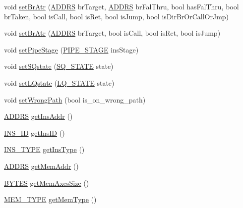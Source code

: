 \begin{DoxyCompactItemize}
\item 
void \hyperlink{classdynInstruction_ac71f51f5c4f207d4993acdfc0a2abbc1}{setBrAtr} (\hyperlink{global_2global_8h_a7ea74bb9ffd2e4d41550ae2383dd25bc}{ADDRS} brTarget, \hyperlink{global_2global_8h_a7ea74bb9ffd2e4d41550ae2383dd25bc}{ADDRS} brFalThru, bool hasFalThru, bool brTaken, bool isCall, bool isRet, bool isJump, bool isDirBrOrCallOrJmp)
\item 
void \hyperlink{classdynInstruction_a4d1879c3a2a4170fb103932044dc863f}{setBrAtr} (\hyperlink{global_2global_8h_a7ea74bb9ffd2e4d41550ae2383dd25bc}{ADDRS} brTarget, bool isCall, bool isRet, bool isJump)
\item 
void \hyperlink{classdynInstruction_a0cb15d906e84b2efc8986b74edaf5adf}{setPipeStage} (\hyperlink{global_2global_8h_a015eb90e0de9f16e87bd149d4b9ce959}{PIPE\_\-STAGE} insStage)
\item 
void \hyperlink{classdynInstruction_a7fc66de5e3f826f515e41029619e2088}{setSQstate} (\hyperlink{global_2global_8h_af9e953470c71a91625fe1fc66f2dc49b}{SQ\_\-STATE} state)
\item 
void \hyperlink{classdynInstruction_a83a5077984f29a340de7bebc7e0b679c}{setLQstate} (\hyperlink{global_2global_8h_a49734aedeaf1d3f1c93c4778b3b62205}{LQ\_\-STATE} state)
\item 
void \hyperlink{classdynInstruction_a794898f3f2f9a99de5f8ca4b8f8999c4}{setWrongPath} (bool is\_\-on\_\-wrong\_\-path)
\item 
\hyperlink{global_2global_8h_a7ea74bb9ffd2e4d41550ae2383dd25bc}{ADDRS} \hyperlink{classdynInstruction_a464da2601438384a3c00e85a814c3964}{getInsAddr} ()
\item 
\hyperlink{global_2global_8h_a1883c47d0023d0f200e1d86eced6a070}{INS\_\-ID} \hyperlink{classdynInstruction_ab38b8181f522daae77cb46d701fb5302}{getInsID} ()
\item 
\hyperlink{binaryTranslator_2global_8h_a7aead736a07eaf25623ad7bfa1f0ee2d}{INS\_\-TYPE} \hyperlink{classdynInstruction_a3a7025de98c539d8eaa06b40ac2e8cc8}{getInsType} ()
\item 
\hyperlink{global_2global_8h_a7ea74bb9ffd2e4d41550ae2383dd25bc}{ADDRS} \hyperlink{classdynInstruction_a611e3f3619160361cf317e05d2034288}{getMemAddr} ()
\item 
\hyperlink{global_2global_8h_a430d9e51ff815ddfce06905ae7392e83}{BYTES} \hyperlink{classdynInstruction_aee508d76a2e13461fce2299234894688}{getMemAxesSize} ()
\item 
\hyperlink{global_2global_8h_a40bc49627faaf5adeed28388c6ffae9c}{MEM\_\-TYPE} \hyperlink{classdynInstruction_a9f8a63685d0b28009957e60b7596b502}{getMemType} ()

\end{DoxyCompactItemize}
